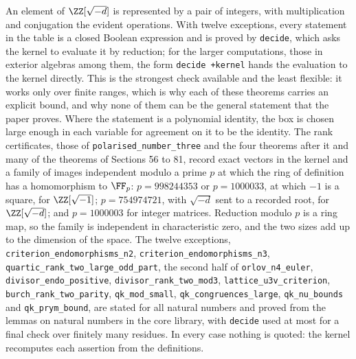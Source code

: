 An element of $\ZZ[\sqrt{-d}]$ is represented by a pair of integers, with
multiplication and conjugation the evident operations. With twelve exceptions,
every statement in the table is a closed Boolean expression and is proved by
\texttt{decide}, which asks the kernel to evaluate it by reduction; for the
larger computations, those in exterior algebras among them, the form
\texttt{decide +kernel} hands the evaluation to the kernel directly. This is
the strongest check available and the least flexible: it works only over
finite ranges, which is why each of these theorems carries an explicit bound,
and why none of them can be the general statement that the paper proves.
Where the statement is a polynomial identity, the box is chosen large enough
in each variable for agreement on it to be the identity. The rank
certificates, those of \texttt{polarised\_}\allowbreak\texttt{number\_}\allowbreak\texttt{three}
and the four theorems after it and many of the theorems of Sections 56 to 81,
record exact vectors in the kernel and a family of images independent modulo
a prime $p$ at which the ring of definition has a homomorphism to
$\FF_{p}$: $p=998244353$ or $p=1000033$, at which $-1$ is a square, for
$\ZZ[\sqrt{-1}]$; $p=754974721$, with $\sqrt{-d}$ sent to a recorded root,
for $\ZZ[\sqrt{-d}]$; and $p=1000003$ for integer matrices. Reduction modulo
$p$ is a ring map, so the family is independent in characteristic zero, and
the two sizes add up to the dimension of the space.
The twelve exceptions,
\texttt{criterion\_}\allowbreak\texttt{endomorphisms\_n2},
\texttt{criterion\_}\allowbreak\texttt{endomorphisms\_n3},
\texttt{quartic\_}\allowbreak\texttt{rank\_}\allowbreak\texttt{two\_}\allowbreak\texttt{large\_}\allowbreak\texttt{odd\_}\allowbreak\texttt{part},
the second half of \texttt{orlov\_}\allowbreak\texttt{n4\_}\allowbreak\texttt{euler},
\texttt{divisor\_}\allowbreak\texttt{endo\_}\allowbreak\texttt{positive},
\texttt{divisor\_}\allowbreak\texttt{rank\_}\allowbreak\texttt{two\_}\allowbreak\texttt{mod3},
\texttt{lattice\_}\allowbreak\texttt{u3v\_}\allowbreak\texttt{criterion},
\texttt{burch\_}\allowbreak\texttt{rank\_}\allowbreak\texttt{two\_}\allowbreak\texttt{parity},
\texttt{qk\_}\allowbreak\texttt{mod\_}\allowbreak\texttt{small},
\texttt{qk\_}\allowbreak\texttt{congruences\_}\allowbreak\texttt{large},
\texttt{qk\_}\allowbreak\texttt{nu\_}\allowbreak\texttt{bounds} and
\texttt{qk\_}\allowbreak\texttt{prym\_}\allowbreak\texttt{bound},
are stated for all natural numbers and proved from the lemmas on natural
numbers in the core library, with \texttt{decide} used at most for a final
check over finitely many residues. In every case nothing is quoted: the
kernel recomputes each assertion from the definitions.

